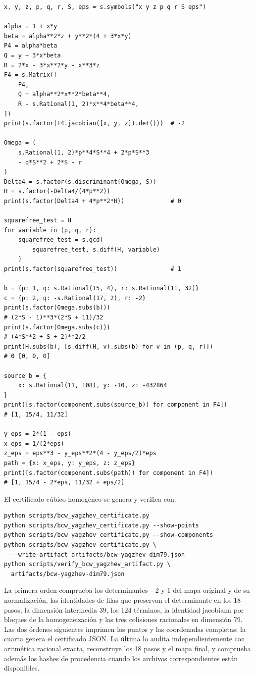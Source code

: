 \documentclass[11pt]{article}
\theoremstyle{definition}
\theoremstyle{remark}
\begin{document}
\small
\begin{verbatim}
x, y, z, p, q, r, S, eps = s.symbols("x y z p q r S eps")

alpha = 1 + x*y
beta = alpha**2*z + y**2*(4 + 3*x*y)
P4 = alpha*beta
Q = y + 3*x*beta
R = 2*x - 3*x**2*y - x**3*z
F4 = s.Matrix([
    P4,
    Q + alpha**2*x**2*beta**4,
    R - s.Rational(1, 2)*x**4*beta**4,
])
print(s.factor(F4.jacobian([x, y, z]).det()))  # -2

Omega = (
    s.Rational(1, 2)*p**4*S**4 + 2*p*S**3
    - q*S**2 + 2*S - r
)
Delta4 = s.factor(s.discriminant(Omega, S))
H = s.factor(-Delta4/(4*p**2))
print(s.factor(Delta4 + 4*p**2*H))             # 0

squarefree_test = H
for variable in (p, q, r):
    squarefree_test = s.gcd(
        squarefree_test, s.diff(H, variable)
    )
print(s.factor(squarefree_test))               # 1

b = {p: 1, q: s.Rational(15, 4), r: s.Rational(11, 32)}
c = {p: 2, q: -s.Rational(17, 2), r: -2}
print(s.factor(Omega.subs(b)))
# (2*S - 1)**3*(2*S + 11)/32
print(s.factor(Omega.subs(c)))
# (4*S**2 + S + 2)**2/2
print(H.subs(b), [s.diff(H, v).subs(b) for v in (p, q, r)])
# 0 [0, 0, 0]

source_b = {
    x: s.Rational(11, 108), y: -10, z: -432864
}
print([s.factor(component.subs(source_b)) for component in F4])
# [1, 15/4, 11/32]

y_eps = 2*(1 - eps)
x_eps = 1/(2*eps)
z_eps = eps**3 - y_eps**2*(4 - y_eps/2)*eps
path = {x: x_eps, y: y_eps, z: z_eps}
print([s.factor(component.subs(path)) for component in F4])
# [1, 15/4 - 2*eps, 11/32 + eps/2]
\end{verbatim}
\normalsize

El certificado c\'ubico homog\'eneo se genera y verifica con:

\small
\begin{verbatim}
python scripts/bcw_yagzhev_certificate.py
python scripts/bcw_yagzhev_certificate.py --show-points
python scripts/bcw_yagzhev_certificate.py --show-components
python scripts/bcw_yagzhev_certificate.py \
  --write-artifact artifacts/bcw-yagzhev-dim79.json
python scripts/verify_bcw_yagzhev_artifact.py \
  artifacts/bcw-yagzhev-dim79.json
\end{verbatim}
\normalsize

La primera orden comprueba los determinantes $-2$ y $1$ del mapa original y de
su normalizaci\'on, las identidades de filas que preservan el determinante en
los 18 pasos, la dimensi\'on intermedia 39, los 124 t\'erminos, la identidad
jacobiana por bloques de la homogeneizaci\'on y las tres colisiones racionales
en dimensi\'on 79. Las dos \'ordenes siguientes imprimen los puntos y las
coordenadas completas; la cuarta genera el certificado JSON. La \'ultima lo
audita independientemente con aritm\'etica racional exacta, reconstruye los 18
pasos y el mapa final, y comprueba adem\'as los hashes de procedencia cuando
los archivos correspondientes est\'an disponibles.
\end{document}
